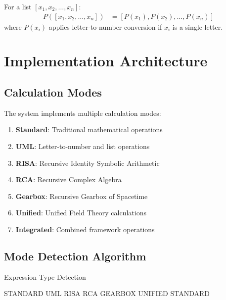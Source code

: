 \documentclass[12pt,a4paper]{article}
\begin{document}
\begin{definition}
For a list $[x_1, x_2, \ldots, x_n]$:
\begin{align}
P([x_1, x_2, \ldots, x_n]) &= [P(x_1), P(x_2), \ldots, P(x_n)]
\end{align}
where $P(x_i)$ applies letter-to-number conversion if $x_i$ is a single letter.
\end{definition}

\section{Implementation Architecture}

\subsection{Calculation Modes}

The system implements multiple calculation modes:

\begin{enumerate}
\item \textbf{Standard}: Traditional mathematical operations
\item \textbf{UML}: Letter-to-number and list operations
\item \textbf{RISA}: Recursive Identity Symbolic Arithmetic
\item \textbf{RCA}: Recursive Complex Algebra
\item \textbf{Gearbox}: Recursive Gearbox of Spacetime
\item \textbf{Unified}: Unified Field Theory calculations
\item \textbf{Integrated}: Combined framework operations
\end{enumerate}

\subsection{Mode Detection Algorithm}

\begin{algorithm}[H]
\caption{Expression Type Detection}
\begin{algorithmic}[1]
    \RETURN STANDARD
    \RETURN UML
    \RETURN RISA
    \RETURN RCA
    \RETURN GEARBOX
    \RETURN UNIFIED
\ELSE
    \RETURN STANDARD
\ENDIF
\end{algorithmic}
\end{algorithm}
\end{document}
